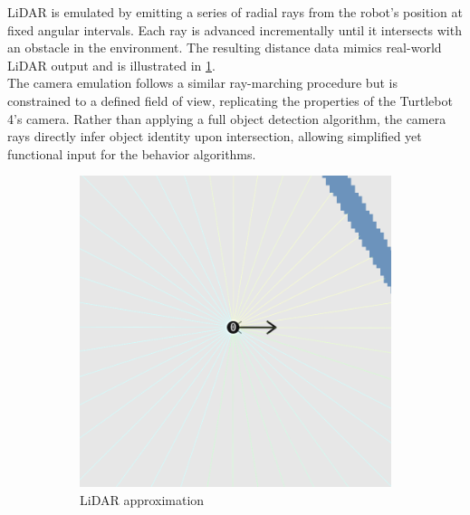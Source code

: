 LiDAR is emulated by emitting a series of radial rays from the robot's position at fixed angular intervals. Each ray is advanced incrementally until it intersects with an obstacle in the environment. The resulting distance data mimics real-world LiDAR output and is illustrated in \cref{fig:lidar-approximation}. \\

The camera emulation follows a similar ray-marching procedure but is constrained to a defined field of view, replicating the properties of the Turtlebot 4’s camera. Rather than applying a full object detection algorithm, the camera rays directly infer object identity upon intersection, allowing simplified yet functional input for the behavior algorithms.

\begin{figure}
    \centering
    \begin{subfigure}[b]{0.45\textwidth}
        \centering
        \includegraphics[width=\textwidth]{figures/screenshots/simple-lidar.png}
        \caption{LiDAR approximation}
        \label{fig:lidar-approximation}
    \end{subfigure}
    \hfill
    \begin{subfigure}[b]{0.45\textwidth}
        \centering

\end{subfigure}
\end{figure}
